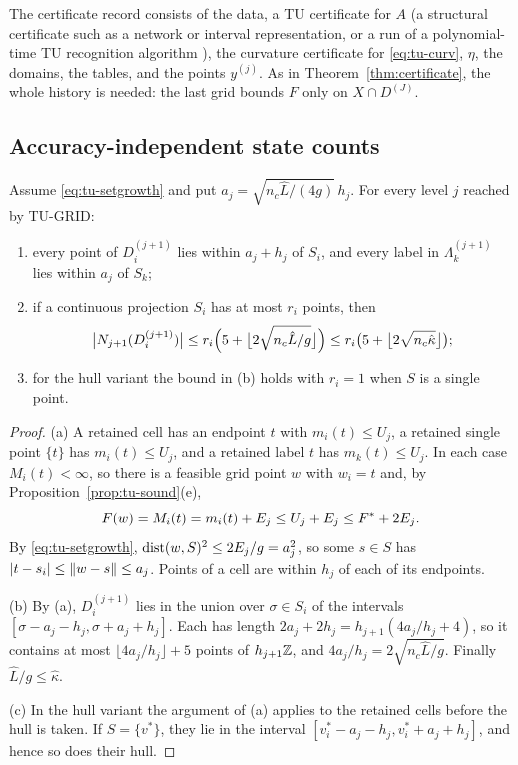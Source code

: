 The certificate record consists of the data, a TU certificate for $A$
(a structural certificate such as a network or interval representation, or a
run of a polynomial-time TU recognition algorithm \cite[Chapter~20]{Schrijver1986}),
the curvature certificate for \eqref{eq:tu-curv}, $\eta$, the domains, the
tables, and the points $y^{(j)}$. As in Theorem~\ref{thm:certificate}, the
whole history is needed: the last grid bounds $F$ only on $X\cap D^{(J)}$.

\subsection{Accuracy-independent state counts}\label{sec:tu-states}

\begin{theorem}\label{thm:tu-states}
Assume \eqref{eq:tu-setgrowth} and put $a_j=\sqrt{n_c\hat L/(4g)}\,h_j$. For
every level $j$ reached by TU-GRID:
\begin{enumerate}[label=(\alph*)]
\item every point of $D^{(j+1)}_i$ lies within $a_j+h_j$ of $S_i$, and every
label in $\Lambda^{(j+1)}_k$ lies within $a_j$ of $S_k$;
\item if a continuous projection $S_i$ has at most $r_i$ points, then
\[
\bigl\lvert N_{j+1}(D^{(j+1)}_i)\bigr\rvert\le
r_i\Bigl(5+\bigl\lfloor2\sqrt{n_c\hat L/g}\bigr\rfloor\Bigr)
\le r_i\bigl(5+\bigl\lfloor2\sqrt{n_c\hat\kappa}\bigr\rfloor\bigr);
\]
\item for the hull variant the bound in (b) holds with $r_i=1$ when $S$ is a
single point.
\end{enumerate}
\end{theorem}

\begin{proof}
(a) A retained cell has an endpoint $t$ with $m_i(t)\le U_j$, a retained
single point $\{t\}$ has $m_i(t)\le U_j$, and a retained label $t$ has
$m_k(t)\le U_j$. In each case $M_i(t)<\infty$, so there is a feasible grid
point $w$ with $w_i=t$ and, by Proposition~\ref{prop:tu-sound}(e),
\[
F(w)=M_i(t)=m_i(t)+E_j\le U_j+E_j\le F^*+2E_j .
\]
By \eqref{eq:tu-setgrowth}, $\operatorname{dist}(w,S)^2\le2E_j/g=a_j^2$, so some $s\in S$
has $\lvert t-s_i\rvert\le\lVert w-s\rVert\le a_j$. Points of a cell are within $h_j$
of each of its endpoints.

(b) By (a), $D^{(j+1)}_i$ lies in the union over $\sigma\in S_i$ of the
intervals $[\sigma-a_j-h_j,\sigma+a_j+h_j]$. Each has length
$2a_j+2h_j=h_{j+1}(4a_j/h_j+4)$, so it contains at most
$\lfloor4a_j/h_j\rfloor+5$ points of $h_{j+1}\mathbb Z$, and
$4a_j/h_j=2\sqrt{n_c\hat L/g}$. Finally $\hat L/g\le\hat\kappa$.

(c) In the hull variant the argument of (a) applies to the retained cells
before the hull is taken. If $S=\{v^*\}$, they lie in the interval
$[v^*_i-a_j-h_j,v^*_i+a_j+h_j]$, and hence so does their hull.
\end{proof}

